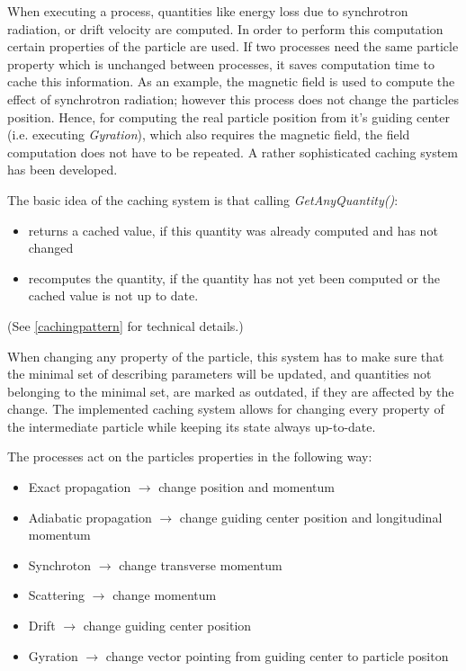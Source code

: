 When executing a process, quantities like energy loss due to synchrotron radiation, or drift velocity are computed. In order to perform this computation certain properties of the particle are used. If two processes need the same particle property which is unchanged between processes, it saves computation time to cache this information. As an example, the magnetic field is used to compute the effect of synchrotron radiation; however this process does not change the particles position. Hence, for computing the real particle position from it's guiding center (i.e. executing \textit{Gyration}), which also requires the magnetic field, the field computation does not have to be repeated. A rather sophisticated caching system has been developed. 

The basic idea of the caching system is that calling \textit{GetAnyQuantity()}: 
\begin{itemize}
    \item returns a cached value, if this quantity was already computed and has not changed
    \item recomputes the quantity, if the quantity has not yet been computed or the cached value is not up to date. 
\end{itemize}
(See \ref{cachingpattern} for technical details.)

When changing any property of the particle, this system has to make sure that the minimal set of describing parameters will be updated, and quantities not belonging to the minimal set, are marked as outdated, if they are affected by the change. The implemented caching system allows for changing every property of the intermediate particle while keeping its state always up-to-date. 

The processes act on the particles properties in the following way:
\begin {itemize}
    \item Exact propagation $\rightarrow$ change position and momentum
    \item Adiabatic propagation $\rightarrow$ change guiding center position and longitudinal momentum
    \item Synchroton $\rightarrow$ change transverse momentum
    \item Scattering $\rightarrow$ change  momentum
    \item Drift $\rightarrow$ change guiding center position
    \item Gyration $\rightarrow$ change vector pointing from guiding center to particle positon
\end {itemize}

